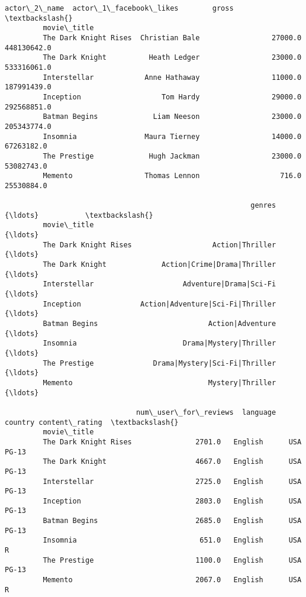 \documentclass[11pt]{article}
\begin{document}
\begin{Verbatim}[commandchars=\\\{\}]
                                  actor\_2\_name  actor\_1\_facebook\_likes        gross  \textbackslash{}
         movie\_title                                                                  
         The Dark Knight Rises  Christian Bale                 27000.0  448130642.0   
         The Dark Knight          Heath Ledger                 23000.0  533316061.0   
         Interstellar            Anne Hathaway                 11000.0  187991439.0   
         Inception                   Tom Hardy                 29000.0  292568851.0   
         Batman Begins             Liam Neeson                 23000.0  205343774.0   
         Insomnia                Maura Tierney                 14000.0   67263182.0   
         The Prestige             Hugh Jackman                 23000.0   53082743.0   
         Memento                 Thomas Lennon                   716.0   25530884.0   
         
                                                          genres         {\ldots}           \textbackslash{}
         movie\_title                                                     {\ldots}            
         The Dark Knight Rises                   Action|Thriller         {\ldots}            
         The Dark Knight             Action|Crime|Drama|Thriller         {\ldots}            
         Interstellar                     Adventure|Drama|Sci-Fi         {\ldots}            
         Inception              Action|Adventure|Sci-Fi|Thriller         {\ldots}            
         Batman Begins                          Action|Adventure         {\ldots}            
         Insomnia                         Drama|Mystery|Thriller         {\ldots}            
         The Prestige              Drama|Mystery|Sci-Fi|Thriller         {\ldots}            
         Memento                                Mystery|Thriller         {\ldots}            
         
                               num\_user\_for\_reviews  language  country content\_rating  \textbackslash{}
         movie\_title                                                                    
         The Dark Knight Rises               2701.0   English      USA          PG-13   
         The Dark Knight                     4667.0   English      USA          PG-13   
         Interstellar                        2725.0   English      USA          PG-13   
         Inception                           2803.0   English      USA          PG-13   
         Batman Begins                       2685.0   English      USA          PG-13   
         Insomnia                             651.0   English      USA              R   
         The Prestige                        1100.0   English      USA          PG-13   
         Memento                             2067.0   English      USA              R   
         

\end{Verbatim}
\end{document}
